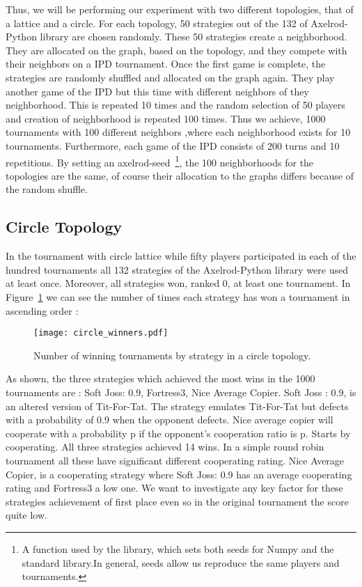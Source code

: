 Thus, we will be performing our experiment with two different topologies, that
of a lattice and a circle. For each topology, 50 strategies out of the 132 of
Axelrod-Python library are chosen randomly. These 50 strategies create a
neighborhood. They are allocated on the graph, based on the topology, and they
compete with their neighbors on a IPD tournament. Once the first game is complete,
the strategies are randomly shuffled and allocated on the graph again.
They play another game of the IPD but this time with different
neighbors of they neighborhood. This is repeated 10 times and the random selection
of 50 players and creation of neighborhood is repeated 100 times.
Thus we achieve, 1000 tournaments with 100 different neighbors ,where each
neighborhood exists for 10 tournaments. Furthermore, each game of the IPD consists
of 200 turns and 10 repetitions.
By setting an axelrod-seed~\footnote{A function used by the library, which sets
both seeds for Numpy and the standard library.In general, seeds allow us
reproduce the same players and tournaments.}, the 100 neighborhoods for the topologies
are the same, of course their allocation to the graphs differs because of the
random shuffle.

\subsection{Circle Topology}
\label{sub:circle}

In the tournament with circle lattice while fifty players participated in each
of the hundred tournaments all 132 strategies of the Axelrod-Python library were
used at least once. Moreover, all strategies won, ranked 0, at least one
tournament. In Figure~\ref{fig:circle_winners}  we can see the number of times
each strategy has won a tournament in ascending order :

\begin{figure}[h!]
  \hspace*{-2cm}
    \texttt{[image: circle\_winners.pdf]}
    \caption{Number of winning tournaments by strategy in a circle topology.}
    \label{fig:circle_winners}
\end{figure}

As shown, %
the three strategies which achieved the most wins in the 1000 tournaments are :
Soft Joss: 0.9, Fortress3, Nice Average Copier. Soft Joss : 0.9, is an altered
version of Tit-For-Tat. The strategy emulates Tit-For-Tat but defects with a
probability of 0.9 when the opponent defects. Nice average copier will cooperate
with a probability p if the opponent's cooperation ratio is p. Starts by cooperating.
All three strategies achieved 14 wins. In a simple round robin tournament
all these have significant  different cooperating rating. Nice Average Copier,
is a cooperating strategy
where Soft Joss: 0.9 has an average cooperating rating and Fortress3 a low one.
We want to investigate any key factor for these strategies
achievement of first place even so in the original tournament the score quite
low.

